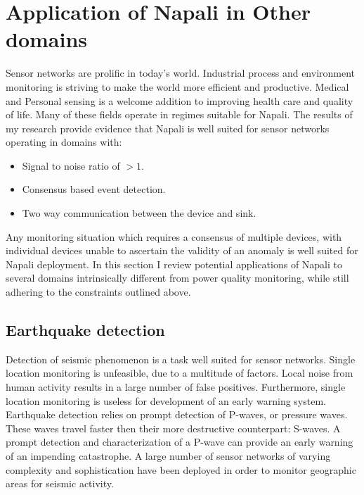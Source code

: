 \section{Application of Napali in Other domains}\label{sec:application-of-napali-in-other-domains}
Sensor networks are prolific in today's world.
Industrial process and environment monitoring is striving to make the world more efficient and productive.
Medical and Personal sensing is a welcome addition to improving health care and quality of life.
Many of these fields operate in regimes suitable for Napali.
The results of my research provide evidence that Napali is well suited for sensor networks operating in domains with:
\begin{itemize}
    \item Signal to noise ratio of $>1$.
    \item Consensus based event detection.
    \item Two way communication between the device and sink.
\end{itemize}
Any monitoring situation which requires a consensus of multiple devices, with individual devices unable to ascertain the validity of an anomaly is well suited for Napali deployment.
In this section I review potential applications of Napali to several domains intrinsically different from power quality monitoring, while still adhering to the constraints outlined above.

\subsection{Earthquake detection}
Detection of seismic phenomenon is a task well suited for sensor networks.
Single location monitoring is unfeasible, due to a multitude of factors.
Local noise from human activity results in a large number of false positives.
Furthermore, single location monitoring is useless for development of an early warning system.
Earthquake detection relies on prompt detection of P-waves, or pressure waves.
These waves travel faster then their more destructive counterpart: S-waves.
A prompt detection and characterization of a P-wave can provide an early warning of an impending catastrophe.
A large number of sensor networks of varying complexity and sophistication have been deployed in order to monitor geographic areas for seismic activity.\cite{burkett2014shakealert}\cite{zaicenco2012lessons}\cite{klapez2018first}\cite{finazzi2017statistical}

